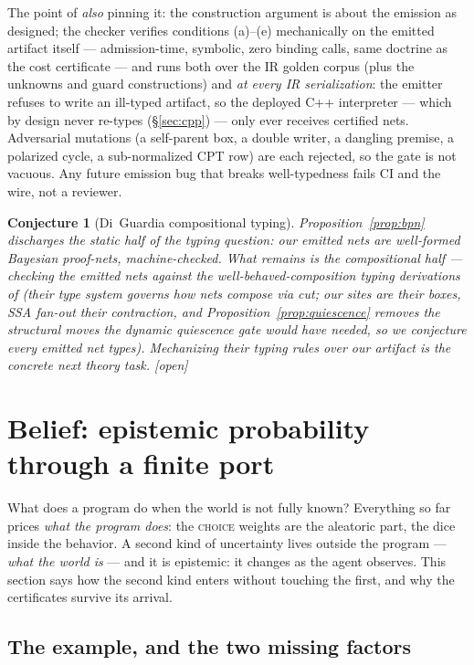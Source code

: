 \documentclass[11pt]{article}
\newcommand{\stopen}{[\textsf{open}]}
\theoremstyle{plain}
\newtheorem{conjecture}[theorem]{Conjecture}
\theoremstyle{definition}
\theoremstyle{remark}
\begin{document}
The point of \emph{also} pinning it: the construction argument is about
the emission as designed; the checker verifies conditions (a)--(e)
mechanically on the emitted artifact itself --- admission-time,
symbolic, zero binding calls, same doctrine as the cost certificate ---
and runs both over the IR golden corpus (plus the unknowns and guard
constructions) and \emph{at every IR serialization}: the emitter
refuses to write an ill-typed artifact, so the deployed C++ interpreter
--- which by design never re-types (\S\ref{sec:cpp}) --- only ever
receives certified nets. Adversarial mutations (a self-parent box, a
double writer, a dangling premise, a polarized cycle, a sub-normalized
CPT row) are each rejected, so the gate is not vacuous. Any future
emission bug that breaks well-typedness fails CI and the wire, not a
reviewer.

\begin{conjecture}[Di~Guardia compositional typing]\label{conj:typing}
Proposition~\ref{prop:bpn} discharges the \emph{static} half of the
typing question: our emitted nets are well-formed Bayesian proof-nets,
machine-checked. What remains is the \emph{compositional} half ---
checking the emitted nets against the well-behaved-composition typing
derivations of \cite{DEF26} (their type system governs how nets compose
via cut; our sites are their boxes, SSA fan-out their contraction, and
Proposition~\ref{prop:quiescence} removes the structural moves the
dynamic quiescence gate would have needed, so we conjecture every
emitted net types). Mechanizing their typing rules over our artifact is
the concrete next theory task. \stopen{}
\end{conjecture}

\section{Belief: epistemic probability through a finite port}
\label{sec:belief}

What does a program do when the world is not fully known? Everything so
far prices \emph{what the program does}: the \textsc{choice} weights are
the aleatoric part, the dice inside the behavior. A second kind of
uncertainty lives outside the program --- \emph{what the world is} ---
and it is epistemic: it changes as the agent observes. This section
says how the second kind enters without touching the first, and why the
certificates survive its arrival.

\subsection{The example, and the two missing factors}
\end{document}
